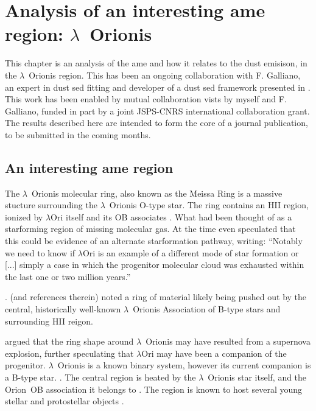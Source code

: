 \chapter{Analysis of an interesting \acrshort{ame} region: $\lambda$~Orionis}
\label{ch:lori}
  This chapter is an analysis of the \acrshort{ame} and how it relates to the dust emisison, in the $\lambda$~Orionis region. This has been an ongoing collaboration with F. Galliano, an expert in dust \acrshort{sed} fitting and developer of a dust \acrshort{sed} framework presented in \cite{galliano18}. This work has been enabled by mutual collaboration vists by myself and F. Galliano, funded in part by a joint JSPS-CNRS international collaboration grant. The results described here are intended to form the core of a journal publication, to be submitted in the coming months.

 \section{An interesting \acrshort{ame} region}
		The $\lambda$~Orionis molecular ring, also known as the Meissa Ring is a massive stucture surrounding the $\lambda$~Orionis O-type star. The ring contains an HII region, ionized by $\lambda$Ori itself and its OB associates \citep{murdin77}. What had been thought of as a star\-forming region of missing molecular gas. At the time \cite{murdin77} even speculated that this could be evidence of an alternate star\-formation pathway, writing: ``Notably we need to know if $\lambda$Ori is an example of a different mode of star formation or [...] simply a case in which the progenitor molecular cloud was exhausted within the last one or two million years.''

    \cite{maddalena86,maddalena87}.  (and references therein) noted a ring of material likely being pushed out by the central, historically well-known $\lambda$~Orionis Association of B-type stars and surrounding HII reigon.


    \cite{cunha96} argued that the ring shape around $\lambda$~Orionis may have resulted from a supernova explosion, further speculating that $\lambda$Ori may have been a companion of the progenitor. $\lambda$~Orionis is a known binary system, however its current companion is a B-type star. \citep{murdin77}
  .
     The central region is heated by the $\lambda$~Orionis star itself, and the Orion~OB association it belongs to \citep{ochsendorf15}. The region is known to host several young stellar and protostellar objects \citep{koenig15}.

